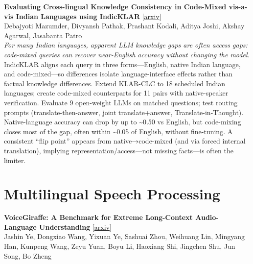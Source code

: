 \documentclass[12pt,letterpaper]{article}
\begin{document}
\medskip

{\small\textbf{Evaluating Cross-lingual Knowledge Consistency in Code-Mixed vis-a-vis Indian Languages using IndicKLAR}} {\scriptsize[\href{https://arxiv.org/abs/2605.29637}{arxiv}]}\\
{\scriptsize Debajyoti Mazumder, Divyansh Pathak, Prashant Kodali, Aditya Joshi, Akshay Agarwal, Jasabanta Patro}\\

{\small\textit{For many Indian languages, apparent LLM knowledge gaps are often access gaps: code-mixed queries can recover near-English accuracy without changing the model.}}\\[1pt]
{\footnotesize IndicKLAR aligns each query in three forms---English, native Indian language, and code-mixed---so differences isolate language-interface effects rather than factual knowledge differences. Extend KLAR-CLC to 18 scheduled Indian languages; create code-mixed counterparts for 11 pairs with native-speaker verification. Evaluate 9 open-weight LLMs on matched questions; test routing prompts (translate-then-answer, joint translate+answer, Translate-in-Thought). Native-language accuracy can drop by up to \textasciitilde{}0.50 vs English, but code-mixing closes most of the gap, often within \textasciitilde{}0.05 of English, without fine-tuning. A consistent ``flip point'' appears from native→code-mixed (and via forced internal translation), implying representation/access---not missing facts---is often the limiter.}

\medskip


\section*{Multilingual Speech Processing}

{\small\textbf{VoiceGiraffe: A Benchmark for Extreme Long-Context Audio-Language Understanding}} {\scriptsize[\href{https://arxiv.org/abs/2605.27976}{arxiv}]}\\
{\scriptsize Jashin Ye, Dongxiao Wang, Yixuan Ye, Sashuai Zhou, Weihuang Lin, Mingyang Han, Kunpeng Wang, Zeyu Yuan, Boyu Li, Haoxiang Shi, Jingchen Shu, Jun Song, Bo Zheng}\\
\end{document}

